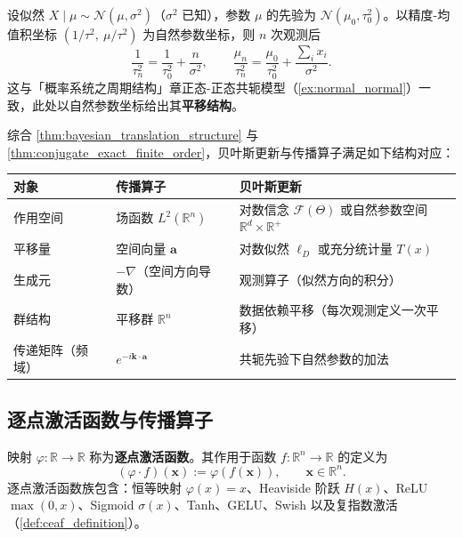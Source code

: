 \begin{example}\label{ex:gaussian_gaussian_exact}
设似然 $X\mid\mu\sim\mathcal{N}(\mu,\sigma^2)$（$\sigma^2$ 已知），参数 $\mu$ 的先验为 $\mathcal{N}(\mu_0,\tau_0^2)$。以精度-均值积坐标 $(1/\tau^2,\ \mu/\tau^2)$ 为自然参数坐标，则 $n$ 次观测后
\[
\frac{1}{\tau_n^2} = \frac{1}{\tau_0^2} + \frac{n}{\sigma^2}, \qquad \frac{\mu_n}{\tau_n^2} = \frac{\mu_0}{\tau_0^2} + \frac{\sum_i x_i}{\sigma^2}.
\]
这与「概率系统之周期结构」章正态-正态共轭模型（\cref{ex:normal_normal}）一致，此处以自然参数坐标给出其\textbf{平移结构}。
\end{example}

\begin{remark}[有限阶演化与传播算子的结构对应表]\label{rem:belief_propagation_correspondence}
综合 \cref{thm:bayesian_translation_structure} 与 \cref{thm:conjugate_exact_finite_order}，贝叶斯更新与传播算子满足如下结构对应：
\begin{center}
\renewcommand{\arraystretch}{1.3}
\begin{tabular}{@{}>{\raggedright\arraybackslash}p{3.2cm} >{\raggedright\arraybackslash}p{4.2cm} >{\raggedright\arraybackslash}p{4.2cm}@{}}
\toprule
\textbf{对象} & \textbf{传播算子} & \textbf{贝叶斯更新} \\
\midrule
作用空间 & 场函数 $L^2(\mathbb{R}^n)$ & 对数信念 $\mathcal{F}(\Theta)$ 或自然参数空间 $\mathbb{R}^d\times\mathbb{R}^+$ \\
平移量 & 空间向量 $\mathbf{a}$ & 对数似然 $\ell_D$ 或充分统计量 $T(x)$ \\
生成元 & $-\nabla$（空间方向导数） & 观测算子（似然方向的积分） \\
群结构 & 平移群 $\mathbb{R}^n$ & 数据依赖平移（每次观测定义一次平移） \\
传递矩阵（频域） & $e^{-i\mathbf{k}\cdot\mathbf{a}}$ & 共轭先验下自然参数的加法 \\
\bottomrule
\end{tabular}
\end{center}
\end{remark}

\subsection{逐点激活函数与传播算子}\label{subsec:pointwise_activation}

\begin{definition}[逐点激活函数]\label{def:pointwise_activation}
映射 $\varphi:\mathbb{R}\to\mathbb{R}$ 称为\textbf{逐点激活函数}。其作用于函数 $f:\mathbb{R}^n\to\mathbb{R}$ 的定义为
\[
(\varphi\cdot f)(\mathbf{x}) := \varphi(f(\mathbf{x})), \qquad \mathbf{x}\in\mathbb{R}^n.
\]
逐点激活函数族包含：恒等映射 $\varphi(x)=x$、Heaviside 阶跃 $H(x)$、ReLU $\max(0,x)$、Sigmoid $\sigma(x)$、Tanh、GELU、Swish 以及复指数激活（\cref{def:ceaf_definition}）。
\end{definition}

